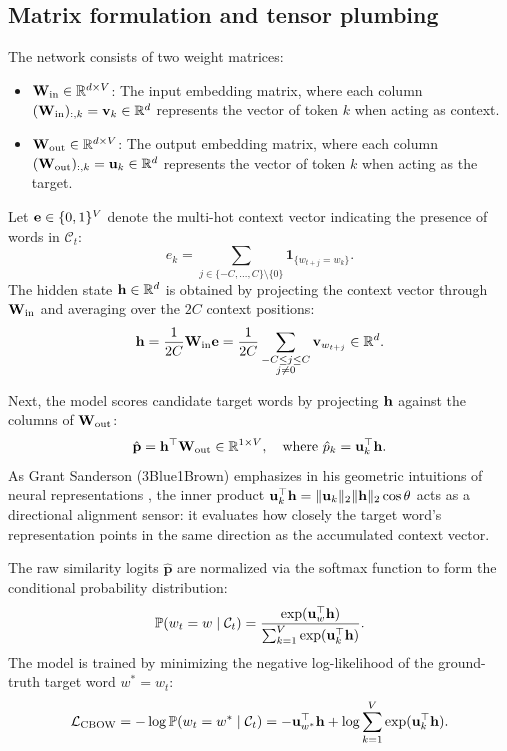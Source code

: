 \documentclass[../../main.tex]{subfiles}
\begin{document}
\subsection{Matrix formulation and tensor plumbing}
\label{subsec:cbow_math_formulation}

The network consists of two weight matrices:
\begin{itemize}
    \item $\mathbf{W}_{\text{in}} \in \mathbb{R}^{d \times V}$: The input embedding matrix, where each column $(\mathbf{W}_{\text{in}})_{:, k} = \mathbf{v}_k \in \mathbb{R}^d$ represents the vector of token $k$ when acting as context.
    \item $\mathbf{W}_{\text{out}} \in \mathbb{R}^{d \times V}$: The output embedding matrix, where each column $(\mathbf{W}_{\text{out}})_{:, k} = \mathbf{u}_k \in \mathbb{R}^d$ represents the vector of token $k$ when acting as the target.
\end{itemize}

Let $\mathbf{e} \in \{0, 1\}^V$ denote the multi-hot context vector indicating the presence of words in $\mathcal{C}_t$:
\begin{equation}
\label{eq:context_indicator}
e_k = \sum_{j \in \{-C, \dots, C\} \setminus \{0\}} \mathbf{1}_{\{w_{t+j} = w_k\}}.
\end{equation}
The hidden state $\mathbf{h} \in \mathbb{R}^d$ is obtained by projecting the context vector through $\mathbf{W}_{\text{in}}$ and averaging over the $2C$ context positions:
\begin{equation}
\label{eq:cbow_hidden_avg}
\mathbf{h} = \frac{1}{2C} \mathbf{W}_{\text{in}} \mathbf{e} = \frac{1}{2C} \sum_{\substack{-C \le j \le C \\ j \neq 0}} \mathbf{v}_{w_{t+j}} \in \mathbb{R}^d.
\end{equation}

Next, the model scores candidate target words by projecting $\mathbf{h}$ against the columns of $\mathbf{W}_{\text{out}}$:
\begin{equation}
\label{eq:cbow_logits}
\hat{\mathbf{p}} = \mathbf{h}^\top \mathbf{W}_{\text{out}} \in \mathbb{R}^{1 \times V}, \quad \text{where } \hat{p}_k = \mathbf{u}_k^\top \mathbf{h}.
\end{equation}
As Grant Sanderson (3Blue1Brown) emphasizes in his geometric intuitions of neural representations \cite{sanderson2024embeddings}, the inner product $\mathbf{u}_k^\top \mathbf{h} = \|\mathbf{u}_k\|_2 \|\mathbf{h}\|_2 \cos \theta$ acts as a directional alignment sensor: it evaluates how closely the target word's representation points in the same direction as the accumulated context vector.

The raw similarity logits $\hat{\mathbf{p}}$ are normalized via the softmax function to form the conditional probability distribution:
\begin{equation}
\label{eq:cbow_softmax}
\mathbb{P}(w_t = w \mid \mathcal{C}_t) = \frac{\exp(\mathbf{u}_w^\top \mathbf{h})}{\sum_{k=1}^V \exp(\mathbf{u}_k^\top \mathbf{h})}.
\end{equation}
The model is trained by minimizing the negative log-likelihood of the ground-truth target word $w^* = w_t$:
\begin{equation}
\label{eq:cbow_loss}
\mathcal{L}_{\text{CBOW}} = -\log \mathbb{P}(w_t = w^* \mid \mathcal{C}_t) = -\mathbf{u}_{w^*}^\top \mathbf{h} + \log \sum_{k=1}^V \exp(\mathbf{u}_k^\top \mathbf{h}).
\end{equation}
\end{document}

